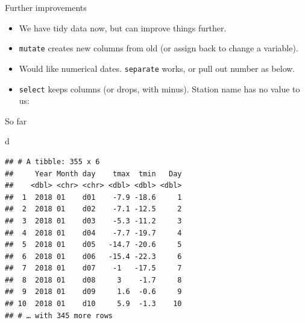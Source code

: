 \documentclass[
  ignorenonframetext,
]{beamer}
\newenvironment{Shaded}{\begin{snugshade}}{\end{snugshade}}
\newcommand{\DataTypeTok}[1]{\textcolor[rgb]{0.13,0.29,0.53}{#1}}
\newcommand{\KeywordTok}[1]{\textcolor[rgb]{0.13,0.29,0.53}{\textbf{#1}}}
\newcommand{\NormalTok}[1]{#1}
\newcommand{\OperatorTok}[1]{\textcolor[rgb]{0.81,0.36,0.00}{\textbf{#1}}}
\newcommand{\StringTok}[1]{\textcolor[rgb]{0.31,0.60,0.02}{#1}}
\providecommand{\tightlist}{%
  \setlength{\itemsep}{0pt}\setlength{\parskip}{0pt}}
\begin{document}
\begin{frame}[fragile]{Further improvements}
\protect\hypertarget{further-improvements}{}

\begin{itemize}
\tightlist
\item
  We have tidy data now, but can improve things further.
\item
  \texttt{mutate} creates new columns from old (or assign back to change
  a variable).
\item
  Would like numerical dates. \texttt{separate} works, or pull out
  number as below.
\item
  \texttt{select} keeps columns (or drops, with minus). Station name has
  no value to us:
\end{itemize}

\small

\begin{Shaded}
\end{Shaded}

\normalsize

\end{frame}

\begin{frame}[fragile]{So far}
\protect\hypertarget{so-far-2}{}

\begin{Shaded}
\begin{Highlighting}[]
\NormalTok{d}
\end{Highlighting}
\end{Shaded}

\begin{verbatim}
## # A tibble: 355 x 6
##     Year Month day    tmax  tmin   Day
##    <dbl> <chr> <chr> <dbl> <dbl> <dbl>
##  1  2018 01    d01    -7.9 -18.6     1
##  2  2018 01    d02    -7.1 -12.5     2
##  3  2018 01    d03    -5.3 -11.2     3
##  4  2018 01    d04    -7.7 -19.7     4
##  5  2018 01    d05   -14.7 -20.6     5
##  6  2018 01    d06   -15.4 -22.3     6
##  7  2018 01    d07    -1   -17.5     7
##  8  2018 01    d08     3    -1.7     8
##  9  2018 01    d09     1.6  -0.6     9
## 10  2018 01    d10     5.9  -1.3    10
## # … with 345 more rows
\end{verbatim}

\end{frame}
\end{document}
